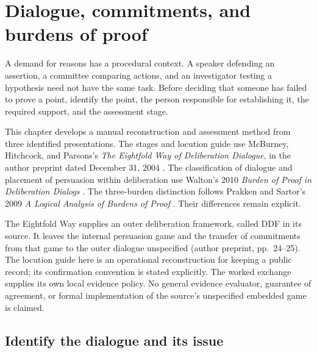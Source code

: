 \chapter{Dialogue, commitments, and burdens of proof}
\label{sec:p18-dialogue-burden}

A demand for reasons has a procedural context. A speaker defending an
assertion, a committee comparing actions, and an investigator testing a
hypothesis need not have the same task. Before deciding that someone has
failed to prove a point, identify the point, the person responsible for
establishing it, the required support, and the assessment stage.

This chapter develops a manual reconstruction and assessment method from
three identified presentations. The stages and locution guide use
McBurney, Hitchcock, and Parsons's \emph{The Eightfold Way of Deliberation
Dialogue}, in the author preprint dated December 31, 2004
\cite{McBurneyHitchcockParsons2004DDF}. The classification of dialogue and
placement of persuasion within deliberation use Walton's 2010
\emph{Burden of Proof in Deliberation Dialogs}
\cite{Walton2010DeliberationBurden}. The three-burden distinction follows
Prakken and Sartor's 2009 \emph{A Logical Analysis of Burdens of Proof}
\cite{PrakkenSartor2009Burdens}. Their differences remain explicit.

The Eightfold Way supplies an outer deliberation framework, called DDF
in its source. It leaves the internal persuasion game and the transfer
of commitments from that game to the outer dialogue unspecified
(author preprint, pp.~24--25). The locution guide here is an operational
reconstruction for keeping a public record; its confirmation convention
is stated explicitly. The worked exchange supplies its own local evidence
policy. No general evidence evaluator, guarantee of agreement, or formal
implementation of the source's unspecified embedded game is claimed.

\section{Identify the dialogue and its issue}
\label{sec:p18-dialogue-types}

